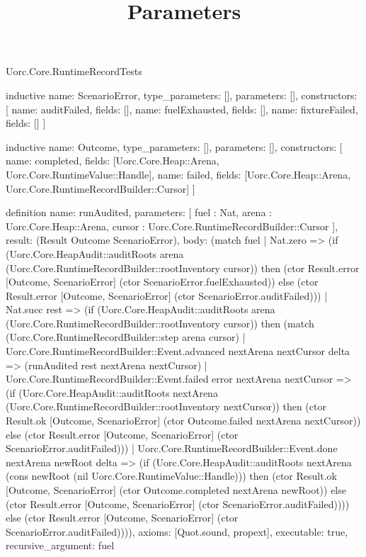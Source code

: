 \begin{lexlean}{Uorc.Core.RuntimeRecordTests}
\title{Parameters}
\begin{semanticmodule}
inductive{
  name: ScenarioError,
  type_parameters: [],
  parameters: [],
  constructors: [
    {name: auditFailed, fields: []},
    {name: fuelExhausted, fields: []},
    {name: fixtureFailed, fields: []}
  ]
}

inductive{
  name: Outcome,
  type_parameters: [],
  parameters: [],
  constructors: [
    {name: completed, fields: [Uorc.Core.Heap::Arena, Uorc.Core.RuntimeValue::Handle]},
    {name: failed, fields: [Uorc.Core.Heap::Arena, Uorc.Core.RuntimeRecordBuilder::Cursor]}
  ]
}

definition{
  name: runAudited,
  parameters: [
    fuel : Nat,
    arena : Uorc.Core.Heap::Arena,
    cursor : Uorc.Core.RuntimeRecordBuilder::Cursor
  ],
  result: (Result Outcome ScenarioError),
  body: (match fuel
    | Nat.zero => (if (Uorc.Core.HeapAudit::auditRoots arena (Uorc.Core.RuntimeRecordBuilder::rootInventory cursor)) then (ctor Result.error [Outcome, ScenarioError] (ctor ScenarioError.fuelExhausted)) else (ctor Result.error [Outcome, ScenarioError] (ctor ScenarioError.auditFailed)))
    | Nat.succ rest => (if (Uorc.Core.HeapAudit::auditRoots arena (Uorc.Core.RuntimeRecordBuilder::rootInventory cursor)) then (match (Uorc.Core.RuntimeRecordBuilder::step arena cursor)
      | Uorc.Core.RuntimeRecordBuilder::Event.advanced nextArena nextCursor delta => (runAudited rest nextArena nextCursor)
      | Uorc.Core.RuntimeRecordBuilder::Event.failed error nextArena nextCursor => (if (Uorc.Core.HeapAudit::auditRoots nextArena (Uorc.Core.RuntimeRecordBuilder::rootInventory nextCursor)) then (ctor Result.ok [Outcome, ScenarioError] (ctor Outcome.failed nextArena nextCursor)) else (ctor Result.error [Outcome, ScenarioError] (ctor ScenarioError.auditFailed)))
      | Uorc.Core.RuntimeRecordBuilder::Event.done nextArena newRoot delta => (if (Uorc.Core.HeapAudit::auditRoots nextArena (cons newRoot (nil Uorc.Core.RuntimeValue::Handle))) then (ctor Result.ok [Outcome, ScenarioError] (ctor Outcome.completed nextArena newRoot)) else (ctor Result.error [Outcome, ScenarioError] (ctor ScenarioError.auditFailed)))) else (ctor Result.error [Outcome, ScenarioError] (ctor ScenarioError.auditFailed)))),
  axioms: [Quot.sound, propext],
  executable: true,
  recursive_argument: fuel
}


\end{semanticmodule}
\end{lexlean}
